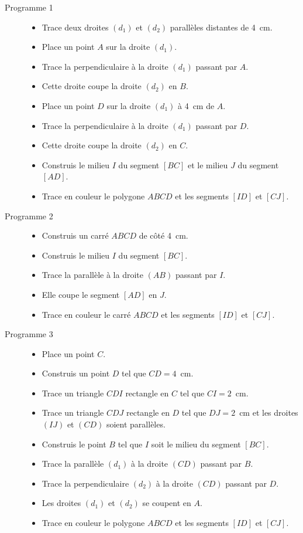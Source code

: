 \begin{description}
\item[Programme 1]\subitem\newline
\begin{itemize}
\item Trace deux droites $(d_1)$ et $(d_2)$ parallèles distantes de
4~cm.
\item Place un point $A$ sur la droite $(d_1)$.
\item Trace la perpendiculaire à la droite $(d_1)$ passant par $A$.
\item Cette droite coupe la droite $(d_2)$ en $B$.
\item Place un point $D$ sur la droite $(d_1)$ à 4~cm de $A$.
\item Trace la perpendiculaire à la droite $(d_1)$ passant par $D$.
\item Cette droite coupe la droite $(d_2)$ en $C$.
\item Construis le milieu $I$ du segment $[BC]$ et le milieu $J$ du
segment $[AD]$.
\item Trace en couleur le polygone $ABCD$ et les segments $[ID]$ et
$[CJ]$.
\end{itemize}
\item[Programme 2]\hfill\newline
  \begin{itemize}
  \item Construis un carré $ABCD$ de côté 4~cm.
  \item Construis le milieu $I$ du segment $[BC]$.
  \item Trace la parallèle à la droite $(AB)$ passant par $I$.
  \item Elle coupe le segment $[AD]$ en $J$.
  \item Trace en couleur le carré $ABCD$ et les segments $[ID]$ et
$[CJ]$.
  \end{itemize}
\item[Programme 3]\hfill\newline
  \begin{itemize}
  \item Place un point $C$.
  \item Construis un point $D$ tel que $CD=4$~cm.
  \item Trace un triangle $CDI$ rectangle en $C$ tel que $CI=2$~cm.
  \item Trace un triangle $CDJ$ rectangle en $D$ tel que $DJ=2$~cm et
les droites $(IJ)$ et $(CD)$ soient parallèles.
  \item Construis le point $B$ tel que $I$ soit le milieu du segment
$[BC]$.
  \item Trace la parallèle $(d_1)$ à la droite $(CD)$ passant par $B$.
  \item Trace la perpendiculaire $(d_2)$ à la droite $(CD)$ passant
par $D$.
  \item Les droites $(d_1)$ et $(d_2)$ se coupent en $A$.
  \item Trace en couleur le polygone $ABCD$ et les segments $[ID]$ et
$[CJ]$.
  \end{itemize}
\end{description}